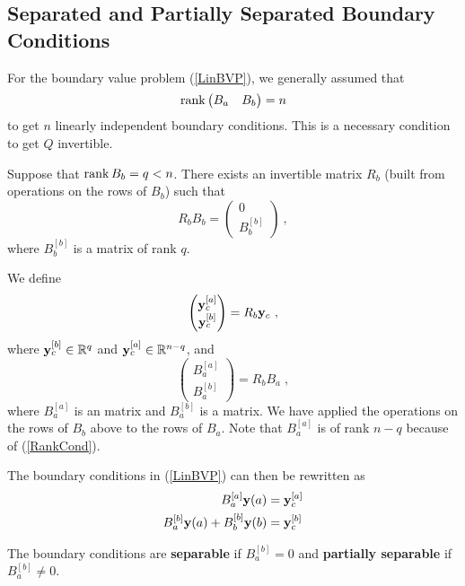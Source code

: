 \subsection{Separated and Partially Separated Boundary Conditions}
\label{SepPartSep}
  
For the boundary value problem (\ref{LinBVP}), we generally assumed that
\begin{equation} \label{RankCond}
\operatorname{rank} \begin{pmatrix} B_a & B_b \end{pmatrix} = n
\end{equation}
to get $n$ linearly independent boundary conditions.   This is a
necessary condition to get $Q$ invertible.

Suppose that $\operatorname{rank} B_b = q < n$.   There exists an \nn invertible
matrix $R_b$ (built from operations on the rows of $B_b$) such that
\[
R_b B_b = \begin{pmatrix} 0 \\ B_b^{[b]} \end{pmatrix} \ ,
\]
where $B_b^{[b]}$ is a  matrix of rank $q$.

We define
\[
\begin{pmatrix} \mathbf{y}_{c}^{[a]} \\ \mathbf{y}_{c}^{[b]} \end{pmatrix} = R_b
\mathbf{y}_c \ ,
\]
where $\mathbf{y}_{c}^{[b]} \in \mathbb{R}^q$ and $\mathbf{y}_{c}^{[a]} \in \mathbb{R}^{n-q}$, and
\[
\begin{pmatrix} B_a^{[a]} \\ B_a^{[b]} \end{pmatrix} = R_b B_a \; ,
\]
where $B_a^{[a]}$ is an  matrix and $B_a^{[b]}$ is a 
matrix.  We have applied the operations on the rows of $B_b$ above to
the rows of $B_a$.   Note that $B_a^{[a]}$ is of rank $n-q$ because of
(\ref{RankCond}).

The boundary conditions in (\ref{LinBVP}) can then be rewritten as 
\begin{equation}\label{LinBVPpartSep}
\begin{split}
B_a^{[a]} \mathbf{y}(a) &= \mathbf{y}_{c}^{[a]} \\
B_a^{[b]} \mathbf{y}(a) + B_b^{[b]} \mathbf{y}(b) &= \mathbf{y}_{c}^{[b]}
\end{split}
\end{equation}

The boundary conditions are
{\bfseries separable} if
$B_a^{[b]} = 0$ and
{\bfseries partially separable} if $B_a^{[b]} \neq 0$.

